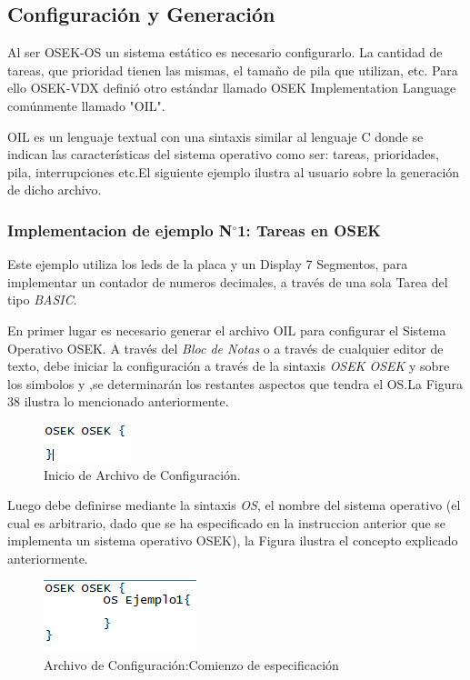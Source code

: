 \documentclass[12pt,letterpaper]{article}
\begin{document}
\subsection{Configuración y Generación}\label{sec:generacionoil}
Al ser OSEK-OS un sistema estático es necesario configurarlo. La cantidad de tareas, que prioridad tienen las mismas, el tamaño de pila que utilizan, etc. Para ello OSEK-VDX definió otro estándar llamado OSEK Implementation Language comúnmente llamado "OIL".

OIL es un lenguaje textual con una sintaxis similar al lenguaje C donde se indican las características del sistema operativo como ser: tareas, prioridades, pila, interrupciones etc.El siguiente ejemplo ilustra al usuario sobre la generación de dicho archivo.

\subsubsection{Implementacion de ejemplo N$^{\circ}$1: Tareas en OSEK}
Este ejemplo utiliza los leds de la placa y un Display 7 Segmentos, para implementar un contador de numeros decimales, a través de una sola Tarea del tipo \textit{BASIC}.

En primer lugar es necesario generar el archivo OIL para configurar el Sistema Operativo OSEK. A través del \textit{Bloc de Notas} o a través de cualquier editor de texto, debe iniciar la configuración a través de la sintaxis \textit{OSEK OSEK} y sobre los simbolos { y } ,se determinarán los restantes aspectos que tendra el OS.La Figura 38 ilustra lo mencionado anteriormente.


\begin{figure}[!h]
\centering
\includegraphics[width=5 cm]{figuras/f18.png}
\caption{Inicio de Archivo de Configuración.}
\label{Fig35}
\end{figure}

Luego debe definirse mediante la sintaxis \textit{OS}, el nombre del sistema operativo (el cual es arbitrario, dado que se ha especificado en la instruccion anterior que se implementa un sistema operativo OSEK), la Figura ilustra el concepto explicado anteriormente.

\begin{figure}[!h]
\centering
\includegraphics[width=5 cm]{figuras/f19.png}
\caption{Archivo de Configuración:Comienzo de especificación}
\label{Fig36}
\end{figure}
\end{document}
